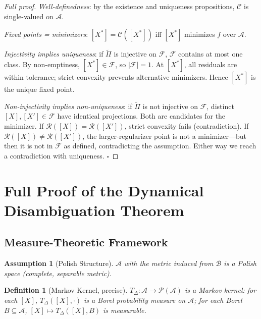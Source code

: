 \documentclass[11pt, oneside]{article}
\newtheorem{definition}[theorem]{Definition}
\newtheorem{assumption}[theorem]{Assumption}
\newcommand{\Ftil}{\widetilde{\Pi}}
\begin{document}
\begin{proof}[Full proof]
\textit{Well-definedness}: by the existence and uniqueness propositions, $\mathcal{C}$ is
single-valued on $\mathcal{A}$.

\textit{Fixed points = minimizers}: $[X^*] = \mathcal{C}([X^*])$ iff $[X^*]$ minimizes
$f$ over $\mathcal{A}$.

\textit{Injectivity implies uniqueness}: if $\Ftil$ is injective on $\mathcal{F}$,
$\mathcal{F}$ contains at most one class. By non-emptiness, $[X^*] \in \mathcal{F}$, so
$|\mathcal{F}| = 1$. At $[X^*]$, all residuals are within tolerance; strict convexity
prevents alternative minimizers. Hence $[X^*]$ is the unique fixed point.

\textit{Non-injectivity implies non-uniqueness}: if $\Ftil$ is not injective on
$\mathcal{F}$, distinct $[X],[X'] \in \mathcal{F}$ have identical projections. Both are
candidates for the minimizer. If $\mathcal{R}([X]) = \mathcal{R}([X'])$, strict
convexity fails (contradiction). If $\mathcal{R}([X]) \ne \mathcal{R}([X'])$, the
larger-regularizer point is not a minimizer---but then it is not in $\mathcal{F}$ as
defined, contradicting the assumption. Either way we reach a contradiction with
uniqueness. $\square$
\end{proof}

\section{Full Proof of the Dynamical Disambiguation Theorem}
\label{app:disambiguation}

\subsection{Measure-Theoretic Framework}

\begin{assumption}[Polish Structure]
$\mathcal{A}$ with the metric induced from $\mathcal{B}$ is a Polish space (complete,
separable metric).
\end{assumption}

\begin{definition}[Markov Kernel, precise]
$T_\Delta : \mathcal{A} \to \mathcal{P}(\mathcal{A})$ is a Markov kernel: for each
$[X]$, $T_\Delta([X],\cdot)$ is a Borel probability measure on $\mathcal{A}$; for each
Borel $B \subseteq \mathcal{A}$, $[X] \mapsto T_\Delta([X],B)$ is measurable.
\end{definition}
\end{document}
